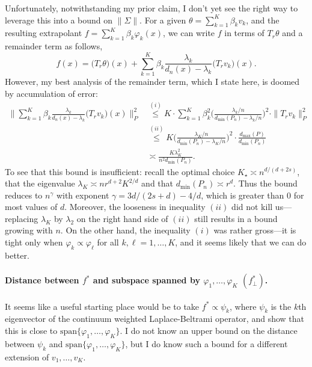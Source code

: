 \documentclass{article}
\newcommand{\1}{\mathbf{1}}
\theoremstyle{definition}
\theoremstyle{remark}
\begin{document}
Unfortunately, notwithstanding my prior claim, I don't yet see the right way to leverage this into a bound on $\|\Sigma\|$. For a given $\theta = \sum_{k = 1}^{K} \beta_k v_k$, and the resulting extrapolant $f = \sum_{k = 1}^{K} \beta_k \varphi_k(x)$, we can write $f$ in terms of $T_r\theta$ and a remainder term as follows,
\begin{equation*}
f(x) = \bigl(T_r\theta\bigr)(x) + \sum_{k = 1}^{K} \beta_k \frac{\lambda_k}{d_n(x) - \lambda_k} \bigl(T_rv_k\bigr)(x).
\end{equation*}
However, my best analysis of the remainder term, which I state here, is doomed by accumulation of error:
\begin{align*}
\biggl\|\sum_{k = 1}^{K} \beta_k \frac{\lambda_k}{d_n(x) - \lambda_k} \bigl(T_rv_k\bigr)(x)\biggr\|_P^2 & \overset{(i)}{\leq} K \cdot \sum_{k = 1}^{K} \beta_k^2  \biggl(\frac{\lambda_k/n}{d_{\min}(P_n) - \lambda_k/n}\biggr)^2 \cdot  \|T_rv_k\|_P^2 \\
& \overset{(ii)}{\leq} K \biggl(\frac{\lambda_K/n}{d_{\min}(P_n) - \lambda_K/n}\biggr)^2 \cdot \frac{d_{\max}(P)}{d_{\min}(P_n)} \\
& \asymp \frac{K \lambda_K^2}{n^2d_{\min}(P_n)}.
\end{align*}
To see that this bound is insufficient: recall the optimal choice $K_{\star} \asymp n^{d/(d + 2s)}$, that the eigenvalue $\lambda_K \asymp nr^{d + 2}K^{2/d}$ and that $d_{\min}(P_n) \asymp r^d$. Thus the bound reduces to $n^{\gamma}$ with exponent $\gamma = 3d/(2s + d) - 4/d$, which is greater than $0$ for most values of $d$. Moreover, the looseness in inequality $(ii)$ did not kill us---replacing $\lambda_K$ by $\lambda_2$ on the right hand side of $(ii)$ still results in a bound growing with $n$. On the other hand, the inequality $(i)$ was rather gross---it is tight only when $\varphi_k \propto \varphi_{\ell}$ for all $k,\ell = 1,\ldots,K$, and it seems likely that we can do better.

\paragraph{Distance between $f^{\ast}$ and subspace spanned by $\varphi_1,\ldots,\varphi_K$ $(f_{\perp}^{\ast})$.}

It seems like a useful starting place would be to take $f^{\ast} \propto \psi_k$, where $\psi_k$ is the $k$th eigenvector of the continuum weighted Laplace-Beltrami operator, and show that this is close to $\mathrm{span}\{\varphi_1,\ldots,\varphi_K\}$. I do not know an upper bound on the distance between $\psi_k$ and $\mathrm{span}\{\varphi_1,\ldots,\varphi_K\}$, but I do know such a bound for a different extension of $v_1,\ldots,v_K$. 
\end{document}
